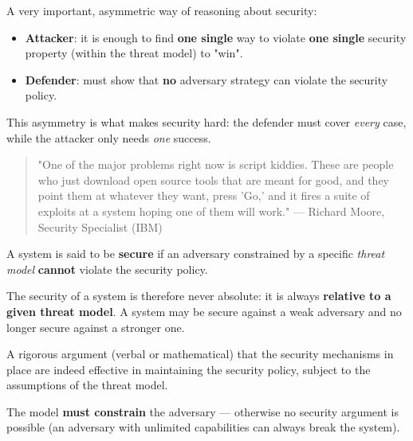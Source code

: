A very important, asymmetric way of reasoning about security:

\begin{itemize}
    \item \textbf{Attacker}: it is enough to find \textbf{one single} way to violate \textbf{one single} security property (within the threat model) to "win".
    \item \textbf{Defender}: must show that \textbf{no} adversary strategy can violate the security policy.
\end{itemize}

This asymmetry is what makes security hard: the defender must cover \emph{every} case, while the attacker only needs \emph{one} success.

\begin{quote}
"One of the major problems right now is script kiddies. These are people who just download open source tools that are meant for good, and they point them at whatever they want, press 'Go,' and it fires a suite of exploits at a system hoping one of them will work." — Richard Moore, Security Specialist (IBM)
\end{quote}

\begin{definition}
A system is said to be \textbf{secure} if an adversary constrained by a specific \emph{threat model} \textbf{cannot} violate the security policy.
\end{definition}

\begin{remark}
The security of a system is therefore never absolute: it is always \textbf{relative to a given threat model}. A system may be secure against a weak adversary and no longer secure against a stronger one.
\end{remark}

\begin{definition}
A rigorous argument (verbal or mathematical) that the security mechanisms in place are indeed effective in maintaining the security policy, subject to the assumptions of the threat model.
\end{definition}

\begin{remark}
The model \textbf{must constrain} the adversary — otherwise no security argument is possible (an adversary with unlimited capabilities can always break the system).
\end{remark}

